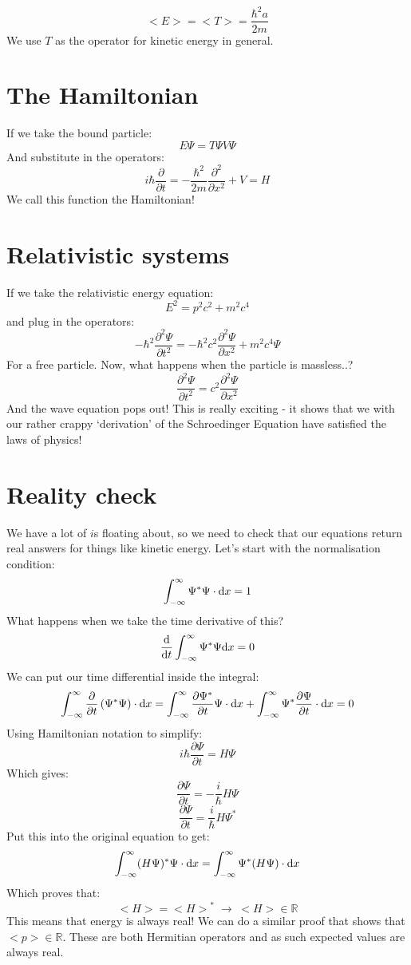 $$
	<E> = <T> = \frac{\hbar^2 a}{2m}
$$
We use $T$ as the operator for kinetic energy in general.

\section{The Hamiltonian}
If we take the bound particle:
$$
	E\Psi = T\Psi V\Psi
$$
And substitute in the operators:
$$
	i\hbar \frac{\partial}{\partial t} =
	-\frac{\hbar^2}{2m}\frac{\partial^2}{\partial x^2} + V = H
$$
We call this function the Hamiltonian!

\section{Relativistic systems}
If we take the relativistic energy equation:
$$
	E^2 = p^2 c^2 + m^2 c^4
$$
and plug in the operators:
$$
	- \hbar^2 \frac{\partial^2 \Psi}{\partial t^2} = 
	- \hbar^2 c^2 \frac{\partial^2 \Psi}{\partial x^2} +
	m^2 c^4 \Psi
$$
For a free particle. Now, what happens when the particle is massless..?
$$
	\frac{\partial^2 \Psi}{\partial t^2} =
	c^2 \frac{\partial^2 \Psi}{\partial x^2}
$$
And the wave equation pops out! This is really exciting - it shows that we 
with our rather crappy `derivation' of the Schroedinger Equation have satisfied
the laws of physics!

\section{Reality check}
We have a lot of $i$s floating about, so we need to check that our equations
return real answers for things like kinetic energy. Let's start with the
normalisation condition:
$$
	\int^\infty_{-\infty} \Psi^* \Psi \cdot \mathrm{d} x = 1
$$
What happens when we take the time derivative of this?
$$
	\frac{\mathrm{d}}{\mathrm{d}t} \int^\infty_{-\infty} \Psi^* \Psi \mathrm{d}x = 0
$$
We can put our time differential inside the integral:
$$
	\int^\infty_{-\infty} \frac{\partial}{\partial t} \left(\Psi^* \Psi\right) \cdot
	\mathrm{d}x = 
	\int^\infty_{-\infty} \frac{\partial \Psi^*}{\partial t} \Psi \cdot \mathrm{d}x
	+ \int^\infty_{-\infty} \Psi^* \frac{\partial \Psi}{\partial t} \cdot \mathrm{d}x
	= 0
$$
Using Hamiltonian notation to simplify:
$$
	i\hbar \frac{\partial \Psi}{\partial t} = H\Psi
$$
Which gives:
$$
	\frac{\partial \Psi}{\partial t} = -\frac{i}{\hbar} H \Psi
$$
$$
	\frac{\partial \Psi}{\partial t} = \frac{i}{\hbar} H \Psi^*
$$
Put this into the original equation to get:
$$
	\int^\infty_{-\infty} (H\Psi)^* \Psi \cdot \mathrm{d}x = 
	\int^\infty_{-\infty} \Psi^* (H\Psi)\cdot \mathrm{d}x
$$
Which proves that:
$$
	<H> = {<H>}^* \; \rightarrow \; <H> \in \mathbb{R}
$$
This means that energy is always real! We can do a similar proof that shows that
$<p> \in \mathbb{R}$. These are both Hermitian operators and as such expected
values are always real.

